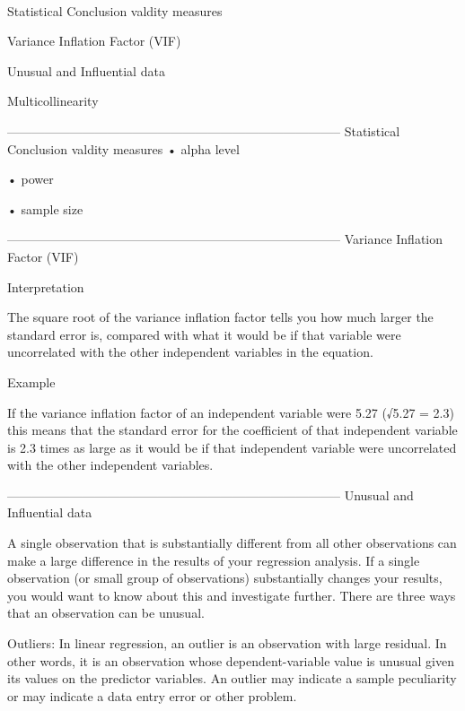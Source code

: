 
 

 



Statistical Conclusion valdity measures

Variance Inflation Factor (VIF)

Unusual and Influential data

Multicollinearity


--------------------------------------------------------------------------------
 Statistical Conclusion valdity measures
•
alpha level

•
power

•
sample size


 


--------------------------------------------------------------------------------
Variance Inflation Factor (VIF)

Interpretation

The square root of the variance inflation factor tells you how much larger the standard error is, compared with what it would be if that variable were uncorrelated with the other independent variables in the equation.

 

Example

If the variance inflation factor of an independent variable were 5.27 (√5.27 = 2.3) this means that the standard error for the coefficient of that independent variable is 2.3 times as large as it would be if that independent variable were uncorrelated with the other independent variables.

 

 


--------------------------------------------------------------------------------
Unusual and Influential data

A single observation that is substantially different from all other observations can make a large difference in the results of your regression analysis.  If a single observation (or small group of observations) substantially changes your results, you would want to know about this and investigate further.  There are three ways that an observation can be unusual.

 

Outliers: In linear regression, an outlier is an observation with large residual. In other words, it is an observation whose dependent-variable value is unusual given its values on the predictor variables. An outlier may indicate a sample peculiarity or may indicate a data entry error or other problem.


